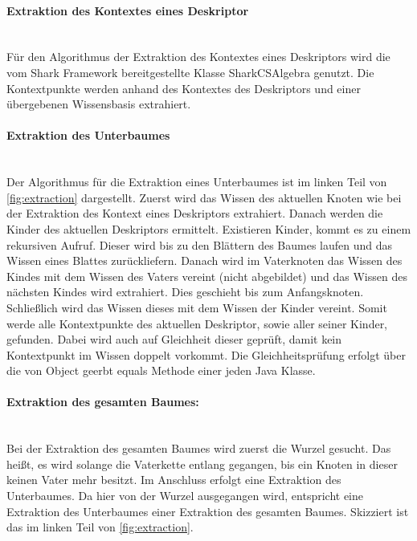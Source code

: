 \documentclass[a4paper]{article}
\begin{document}
	\paragraph{Extraktion des Kontextes eines Deskriptor}\mbox{} \\
	
	Für den Algorithmus der Extraktion des Kontextes eines Deskriptors wird
	die vom Shark Framework bereitgestellte Klasse SharkCSAlgebra genutzt.
	Die Kontextpunkte werden anhand des Kontextes des Deskriptors und einer
	übergebenen Wissensbasis extrahiert.
	
	\paragraph{Extraktion des Unterbaumes}\mbox{} \\
	
	Der Algorithmus für die Extraktion eines Unterbaumes ist im linken Teil von
	\autoref{fig:extraction} dargestellt. Zuerst wird das Wissen des aktuellen
	Knoten wie bei der Extraktion des Kontext eines Deskriptors extrahiert.
	Danach werden die Kinder des aktuellen Deskriptors ermittelt. Existieren
	Kinder, kommt es zu einem rekursiven Aufruf. Dieser wird bis zu den Blättern
	des Baumes laufen und das Wissen eines Blattes zurückliefern. Danach wird
	im Vaterknoten das Wissen des Kindes mit dem Wissen des Vaters vereint (nicht 
	abgebildet) und das Wissen des nächsten Kindes wird extrahiert. Dies geschieht
	bis zum Anfangsknoten. Schließlich wird das Wissen dieses mit dem Wissen der
	Kinder vereint. Somit werde alle Kontextpunkte des aktuellen
	Deskriptor,	sowie aller seiner Kinder, gefunden. Dabei wird auch auf Gleichheit
	dieser geprüft, damit kein Kontextpunkt im Wissen doppelt vorkommt. Die
	Gleichheitsprüfung erfolgt über die von Object geerbt equals Methode einer jeden
	Java Klasse.
	
	\newpage
	\paragraph{Extraktion des gesamten Baumes:}\mbox{} \\
	
	Bei der Extraktion des gesamten Baumes wird zuerst die Wurzel gesucht. Das heißt,
	es wird solange die Vaterkette entlang gegangen, bis ein Knoten in dieser keinen 		Vater mehr besitzt. Im Anschluss erfolgt eine Extraktion des Unterbaumes. Da
	hier von der Wurzel ausgegangen wird, entspricht eine Extraktion des Unterbaumes
	einer Extraktion des gesamten Baumes. Skizziert ist das im linken Teil von
	\autoref{fig:extraction}. \\
	
\end{document}
